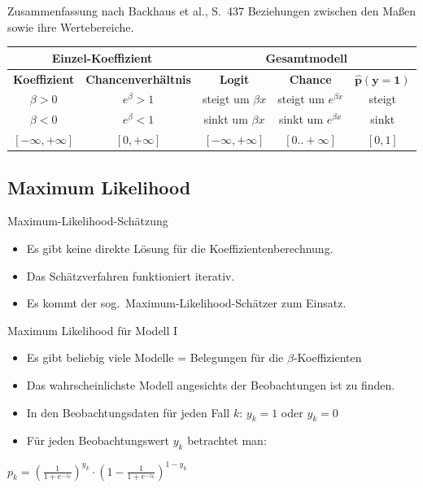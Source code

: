 \begin{frame}
  {Zusammenfassung nach Backhaus et al., S.\ 437}
  Beziehungen zwischen den Maßen\\
  sowie ihre Wertebereiche.\\
  \vspace{0.5cm}
  \begin{center}
    \scalebox{0.9}
    {
      \begin{tabular}[h!]{|c|c||c|c|c|}
	\hline
	\multicolumn{2}{|c||}{\textbf{Einzel-Koeffizient}} & \multicolumn{3}{c|}{\textbf{Gesamtmodell}} \\
	\hline
	\textbf{Koeffizient} & \textbf{Chancenverhältnis} & \textbf{Logit} & \textbf{Chance} & $\mathbf{\hat{p}(y=1)}$ \\
	\hline\hline
	$\beta>0$ & $e^{\beta}>1$ & steigt um $\beta x$ & steigt um $e^{\beta x}$ & steigt \\
	\hline
	$\beta<0$ & $e^{\beta}<1$ & sinkt um $\beta x$ & sinkt um $e^{\beta x}$ & sinkt \\
	\hline\hline
	$[-\infty,+\infty]$ & $[0,+\infty]$ & $[-\infty,+\infty]$ & $[0..+\infty]$ & $[0,1]$ \\
	\hline
      \end{tabular}
    }
  \end{center}
\end{frame}

\subsection{Maximum Likelihood}

\begin{frame}
  {Maximum-Likelihood-Schätzung}
  \begin{itemize}[<+->]
    \item Es gibt keine direkte Lösung für die Koeffizientenberechnung.
    \item Das Schätzverfahren funktioniert iterativ.
    \item Es kommt der sog.\ Maximum-Likelihood-Schätzer zum Einsatz.
  \end{itemize}
\end{frame}

\begin{frame}
  {Maximum Likelihood für Modell I}
  \begin{itemize}[<+->]
    \item Es gibt beliebig viele Modelle = Belegungen für die $\beta$-Koeffizienten
    \item Das \alert{wahrscheinlichste Modell angesichts der Beobachtungen} ist zu finden.
    \item In den Beobachtungsdaten für jeden Fall $k$: \alert{$y_k=1$ oder $y_k=0$}
    \item Für jeden Beobachtungswert $y_k$ betrachtet man:
  \end{itemize}
  \pause
  \begin{center}
    $p_k=(\frac{1}{1+e^{-z_k}})^{y_k}\cdot(1-\frac{1}{1+e^{-z_k}})^{1-y_k}$
  \end{center}
\end{frame}

